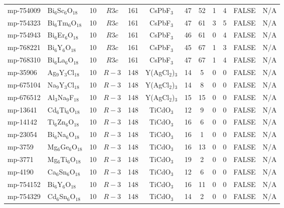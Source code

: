 {\begin{longtable}{llcccccccccc}
    mp-754009 & Bi$_{6}$Sc$_{6}$O$_{18}$ & 10    & $R3c$ & 161   & CsPbF$_{3}$ & 47    & 52    & 1     & 4     & FALSE & N/A \\
    mp-754323 & Bi$_{6}$Tm$_{6}$O$_{18}$ & 10    & $R3c$ & 161   & CsPbF$_{3}$ & 47    & 61    & 3     & 5     & FALSE & N/A \\
    mp-754943 & Bi$_{6}$Er$_{6}$O$_{18}$ & 10    & $R3c$ & 161   & CsPbF$_{3}$ & 46    & 61    & 0     & 4     & FALSE & N/A \\
    mp-768221 & Bi$_{6}$Y$_{6}$O$_{18}$ & 10    & $R3c$ & 161   & CsPbF$_{3}$ & 45    & 67    & 1     & 3     & FALSE & N/A \\
    mp-768310 & Bi$_{6}$La$_{6}$O$_{18}$ & 10    & $R3c$ & 161   & CsPbF$_{3}$ & 47    & 67    & 1     & 4     & FALSE & N/A \\
    mp-35906 & Ag$_{9}$Y$_{3}$Cl$_{18}$ & 10    & $R-3$ & 148   & Y(AgCl$_{2}$)$_{3}$ & 14    & 5     & 0     & 0     & FALSE & N/A \\
    mp-675104 & Na$_{9}$Y$_{3}$Cl$_{18}$ & 10    & $R-3$ & 148   & Y(AgCl$_{2}$)$_{3}$ & 14    & 8     & 0     & 0     & FALSE & N/A \\
    mp-676512 & Al$_{3}$Na$_{9}$F$_{18}$ & 10    & $R-3$ & 148   & Y(AgCl$_{2}$)$_{3}$ & 15    & 15    & 0     & 0     & FALSE & N/A \\
    mp-13641 & Cd$_{6}$Ti$_{6}$O$_{18}$ & 10    & $R-3$ & 148   & TiCdO$_{3}$ & 12    & 9     & 0     & 0     & FALSE & N/A \\
    mp-14142 & Ti$_{6}$Zn$_{6}$O$_{18}$ & 10    & $R-3$ & 148   & TiCdO$_{3}$ & 16    & 6     & 0     & 0     & FALSE & N/A \\
    mp-23054 & Bi$_{6}$Na$_{6}$O$_{18}$ & 10    & $R-3$ & 148   & TiCdO$_{3}$ & 16    & 1     & 0     & 0     & FALSE & N/A \\
    mp-3759 & Mg$_{6}$Ge$_{6}$O$_{18}$ & 10    & $R-3$ & 148   & TiCdO$_{3}$ & 16    & 13    & 0     & 0     & FALSE & N/A \\
    mp-3771 & Mg$_{6}$Ti$_{6}$O$_{18}$ & 10    & $R-3$ & 148   & TiCdO$_{3}$ & 19    & 2     & 0     & 0     & FALSE & N/A \\
    mp-4190 & Ca$_{6}$Sn$_{6}$O$_{18}$ & 10    & $R-3$ & 148   & TiCdO$_{3}$ & 12    & 6     & 0     & 0     & FALSE & N/A \\
    mp-754152 & Bi$_{6}$Y$_{6}$O$_{18}$ & 10    & $R-3$ & 148   & TiCdO$_{3}$ & 16    & 11    & 0     & 0     & FALSE & N/A \\
    mp-754329 & Cd$_{6}$Sn$_{6}$O$_{18}$ & 10    & $R-3$ & 148   & TiCdO$_{3}$ & 14    & 2     & 0     & 0     & FALSE & N/A \\

\end{longtable}}
